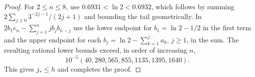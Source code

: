 \begin{proof}
For $2\le n\le8$, use $0.6931<\ln2<0.6932$, which follows by summing
$2\sum_{j\ge0}3^{-2j-1}/(2j+1)$ and bounding the tail geometrically.
In $2b_1e_n-\sum_{j=1}^n j b_j b_{n-j}$ use the lower endpoint for
$b_1=\ln2-1/2$ in the first term and the upper endpoint for each
$b_j=\ln2-\sum_{k=1}^j a_k$, $j\ge1$, in the sum. The resulting rational
lower bounds exceed, in order of increasing $n$,
\begin{equation*}
 10^{-5}(40,280,565,855,1135,1395,1640).
\end{equation*}
This gives $j_*\le h$ and completes the proof.
\end{proof}
